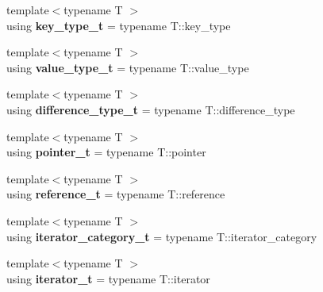 \begin{DoxyCompactItemize}
\mbox{\label{namespacenlohmann_1_1detail_a66dfe39f03b05d6b7265a0ff748d64ef}} 
{\footnotesize template$<$typename T $>$ }\\using {\bfseries key\+\_\+type\+\_\+t} = typename T\+::key\+\_\+type
\item 
\mbox{\label{namespacenlohmann_1_1detail_af91beae90c2fb0f931079b3d50a343bc}} 
{\footnotesize template$<$typename T $>$ }\\using {\bfseries value\+\_\+type\+\_\+t} = typename T\+::value\+\_\+type
\item 
\mbox{\label{namespacenlohmann_1_1detail_a3603b59a17d1c5e15050743b847992f2}} 
{\footnotesize template$<$typename T $>$ }\\using {\bfseries difference\+\_\+type\+\_\+t} = typename T\+::difference\+\_\+type
\item 
\mbox{\label{namespacenlohmann_1_1detail_a26dc71e2dd9336587e56062178f9abce}} 
{\footnotesize template$<$typename T $>$ }\\using {\bfseries pointer\+\_\+t} = typename T\+::pointer
\item 
\mbox{\label{namespacenlohmann_1_1detail_a082bdafd3b4c61d9d1e92b35b8f75ee3}} 
{\footnotesize template$<$typename T $>$ }\\using {\bfseries reference\+\_\+t} = typename T\+::reference
\item 
\mbox{\label{namespacenlohmann_1_1detail_ad22d2aa3aab018050ae519f6754366e1}} 
{\footnotesize template$<$typename T $>$ }\\using {\bfseries iterator\+\_\+category\+\_\+t} = typename T\+::iterator\+\_\+category
\item 
\mbox{\label{namespacenlohmann_1_1detail_a9ff93db146174305bce1bc4c54703e11}} 
{\footnotesize template$<$typename T $>$ }\\using {\bfseries iterator\+\_\+t} = typename T\+::iterator
\item 
\mbox{\label{namespacenlohmann_1_1detail_af846b6cf2f926009ff3a7a61495ca383}} 

\end{DoxyCompactItemize}
